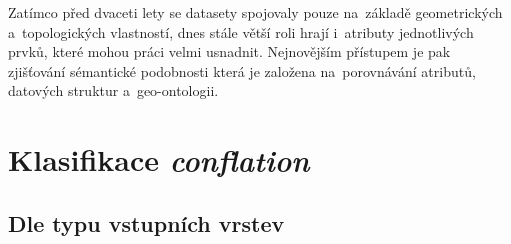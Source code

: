 Zatímco před dvaceti lety se datasety spojovaly pouze na~základě
geometric\-kých a~topologických vlastností, dnes stále větší roli hrají
i~atributy jednotlivých prvků, které mohou práci velmi usnadnit.
Nejnovějším přístupem je pak zjišťování sémantické podobnosti %
která je založena na~porovnávání atributů, datových struktur 
a~geo-ontologii.

% 


\section{Klasifikace \textit{conflation}}
\label{klasifikace}

\subsection{Dle typu vstupních vrstev}
\label{dle-vstupu}

